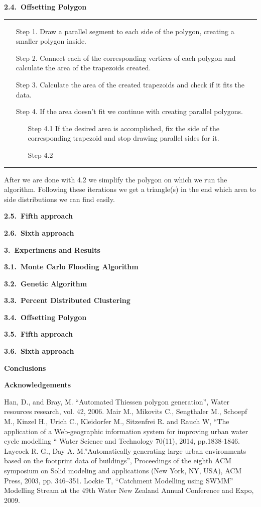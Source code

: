 \documentclass[11pt,leqno]{book}
\def\bibname{{\Large\bf References}}
\newcommand{\sect}[1]{\vskip7mm\par{\large \bf #1}}
\newcommand{\subsect}[1]{\vskip 3mm\par{\bf#1}}
\begin{document}
\subsect{2.4.~Offsetting Polygon}

\noindent\rule{\textwidth}{1pt}
\begin{itemize}
\item[Step 1.] Draw a parallel segment to each side of the polygon, creating a smaller polygon inside. 
\item[Step 2.] Connect each of the corresponding vertices of each polygon and calculate the area of the trapezoids created.
\item[Step 3.] Calculate the area of the created trapezoids and check if it fits the data.
\item[Step 4.] If the area doesn’t fit we continue with creating parallel polygons.
\begin{itemize}
  \item[Step 4.1] If the desired area is accomplished, fix the side of the corresponding trapezoid and stop drawing parallel sides for it.
  \item[Step 4.2] 
\end{itemize}
\end{itemize}
\noindent\rule{\textwidth}{1pt}

After we are done with 4.2 we simplify the polygon on which we run the algorithm. Following these iterations we get a triangle(s) in the end which area to side distributions we can find easily.

\subsect{2.5.~Fifth approach}

\subsect{2.6.~Sixth approach}

\sect{3.~Experimens and Results}

\subsect{3.1.~Monte Carlo Flooding Algorithm}

\subsect{3.2.~Genetic Algorithm}

\subsect{3.3.~Percent Distributed Clustering}

\subsect{3.4.~Offsetting Polygon}

\subsect{3.5.~Fifth approach}

\subsect{3.6.~Sixth approach}

\sect{Conclusions}

\sect{Acknowledgements}

\def\bibname{{\Large\bf References}}
\begin{thebibliography}{99}
%
 Han, D., and Bray, M. “Automated Thiessen polygon generation”, Water resources research, vol. 42, 2006.
%
 Mair M., Mikovits C., Sengthaler M., Schoepf M., Kinzel H., Urich C., Kleidorfer M., Sitzenfrei R. and Rauch W, “The application of a Web-geographic information system for improving urban water cycle modelling “  Water Science and Technology 70(11), 2014, pp.1838-1846.
%
 Laycock R. G., Day A. M.”Automatically generating large urban environments based on the footprint data of buildings”, Proceedings of the eighth ACM symposium on Solid modeling and applications (New York, NY, USA), ACM Press, 2003, pp. 346–351.
%
 Lockie T, “Catchment Modelling using SWMM” Modelling Stream at the 49th Water New Zealand Annual Conference and Expo, 2009.
%
\end{thebibliography}
%
\end{document}
